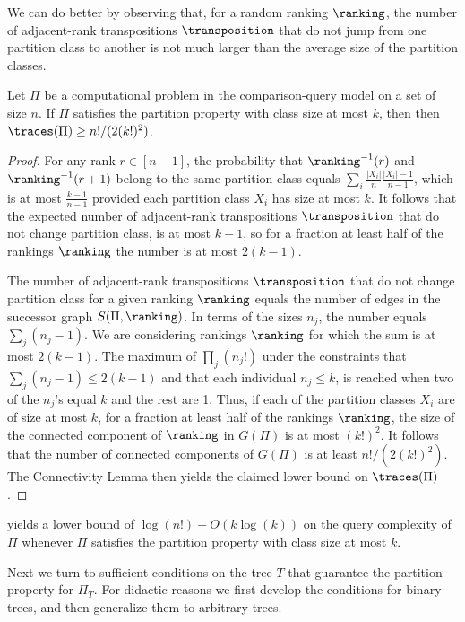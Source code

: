 \documentclass{toc}
\begin{document}
We can do better by observing that, for a random ranking $\ranking$, the number of adjacent-rank transpositions $\transposition$ that do not jump from one partition class to another is not much larger than the average size of the partition classes.
\begin{lemma}\label{lemma:connectivity:sensitive}
Let $\Pi$ be a computational problem in the comparison-query model on a set of size $n$. If $\Pi$ satisfies the partition property with class size at most $k$, then then $\traces(\Pi) \ge n!/(2(k!)^2)$.
\end{lemma}
\begin{proof}
For any rank $r \in [n-1]$, the probability that $\ranking^{-1}(r)$ and $\ranking^{-1}(r+1)$ belong to the same partition class equals $\sum_i \frac{|X_i|}{n} \frac{|X_i|-1}{n-1}$, which is at most $\frac{k-1}{n-1}$ provided each partition class $X_i$ has size at most $k$. It follows that the expected number of adjacent-rank transpositions $\transposition$ that do not change partition class, is at most $k-1$, so for a fraction at least half of the rankings $\ranking$ the number is at most $2(k-1)$.

The number of adjacent-rank transpositions $\transposition$ that do not change partition class for a given ranking $\ranking$ equals the number of edges in the successor graph $S(\Pi,\ranking)$. In terms of the sizes $n_j$, the number equals $\sum_j (n_j-1)$. We are considering rankings $\ranking$ for which the sum is at most $2(k-1)$. The maximum of $\prod_j (n_j!)$ under the constraints that $\sum_j (n_j-1) \le 2(k-1)$ and that each individual $n_j \le k$, is reached when two of the $n_j$'s equal $k$ and the rest are 1. Thus, if each of the partition classes $X_i$ are of size at most $k$, for a fraction at least half of the rankings $\ranking$, the size of the connected component of $\ranking$ in $G(\Pi)$ is at most $(k!)^2$. It follows that the number of connected components of $G(\Pi)$ is at least $n!/(2(k!)^2)$. The Connectivity Lemma then yields the claimed lower bound on $\traces(\Pi)$.
\end{proof}

 yields a lower bound of $\log(n!) - O(k \log(k))$ on the query complexity of $\Pi$ whenever $\Pi$ satisfies the partition property with class size at most $k$. 

Next we turn to sufficient conditions on the tree $T$ that guarantee the partition property for $\Pi_T$. For didactic reasons we first develop the conditions for binary trees, and then generalize them to arbitrary trees.
\end{document}
